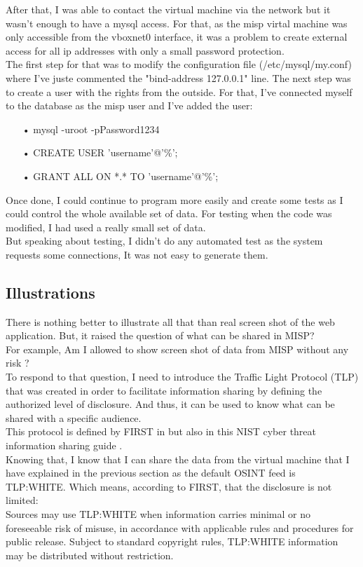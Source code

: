 \documentclass{eplmastersthesis}
\begin{document}
After that, I was able to contact the virtual machine via the network but it wasn't enough to have a mysql access. For that, as the misp virtal machine was only accessible from the vboxnet0 interface, it was a problem to create external access for all ip addresses with only a small password protection.\\
The first step for that was to modify the configuration file (/etc/mysql/my.conf) where I've juste commented the "bind-address 127.0.0.1" line.
The next step was to create a user with the rights from the outside. For that, I've connected myself to the database as the misp user and I've added the user:
\begin{itemize}
\item[•] mysql -uroot -pPassword1234 
\item[•] CREATE USER 'username'@'\%';
\item[•] GRANT ALL ON *.* TO 'username'@'\%';
\end{itemize}

Once done, I could continue to program more easily and create some tests as I could control the whole available set of data. For testing when the code was modified, I had used a really small set of data. \\
But speaking about testing, I didn't do any automated test as the system requests some connections, It was not easy to generate them. 

\subsection{Illustrations}
There is nothing better to illustrate all that than real screen shot of the web application. But, it raised the question of what can be shared in MISP?\\
For example, Am I allowed to show screen shot of data from MISP without any risk ?\\
To respond to that question, I need to introduce the Traffic Light Protocol (TLP) that was created in order to facilitate information sharing by defining the authorized level of disclosure. And thus, it can be used to know what can be shared with a specific audience.\\
This protocol is defined by FIRST in \cite{FirstTLP} but also in this NIST cyber threat information sharing guide \cite{johnson2016guide}.\\

Knowing that, I know that I can share the data from the virtual machine that I have explained in the previous section as the default OSINT feed is TLP:WHITE. Which means, according to FIRST, that the disclosure is not limited: \\
Sources may use TLP:WHITE when information carries minimal or no foreseeable risk of misuse, in accordance with applicable rules and procedures for public release. Subject to standard copyright rules, TLP:WHITE information may be distributed without restriction.\\
\end{document}

